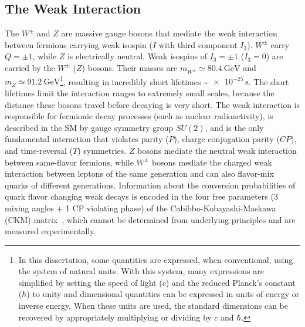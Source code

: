 \begin{refsection}
\subsection{The Weak Interaction}
The $W^\pm$ and $Z$ are massive gauge bosons that mediate the weak interaction between fermions carrying weak isospin ($I$ with third component $I_3$).
$W^\pm$ carry $Q = \pm 1$, while $Z$ is electrically neutral.
Weak isospins of $I_3 = \pm 1$ ($I_3 = 0$) are carried by the $W^\pm$ ($Z$) bosons.
Their masses are $m_{W^\pm} \simeq \SI{80.4}{\GeV}$ and $m_Z \simeq \SI{91.2}{\GeV}$\footnote{In this dissertation, some quantities are expressed, when conventional, using the system of natural units. With this system, many expressions are simplified by setting the speed of light ($c$) and the reduced Planck's constant ($\hbar$) to unity and dimensional quantities can be expressed in units of energy or inverse energy. 
When these units are used, the standard dimensions can be recovered by appropriately multiplying or dividing by $c$ and $\hbar$.}, resulting in incredibly short lifetimes \sim$\SI{e-25}{\s}$. The short lifetimes limit the interaction ranges to extremely small scales, because the distance these bosons travel before decaying is very short.
The weak interaction is responsible for fermionic decay processes (such as nuclear radioactivity), is described in the SM by gauge symmetry group $SU(2)$, and is the only fundamental interaction that violates parity ($P$), charge conjugation parity ($CP$), and time-reversal ($T$) symmetries.
$Z$ bosons mediate the neutral weak interaction between same-flavor fermions, while $W^\pm$ bosons mediate the charged weak interaction between leptons of the same generation and can also flavor-mix quarks of different generations.
Information about the conversion probabilities of quark flavor changing weak decays is encoded in the four free parameters (3 mixing angles + 1 CP violating phase) of the Cabibbo-Kobayashi-Maskawa (CKM) matrix~\cite{10.1143/PTP.49.652}, which cannot be determined from underlying principles and are measured experimentally.


\end{refsection}
